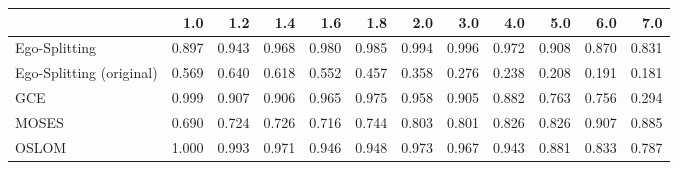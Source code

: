 \begin{tabular}{lrrrrrrrrrrr}
\toprule
{} &   1.0 &   1.2 &   1.4 &   1.6 &   1.8 &   2.0 &   3.0 &   4.0 &   5.0 &   6.0 &   7.0 \\
\midrule
Ego-Splitting            & 0.897 & 0.943 & 0.968 & 0.980 & 0.985 & 0.994 & 0.996 & 0.972 & 0.908 & 0.870 & 0.831 \\
Ego-Splitting (original) & 0.569 & 0.640 & 0.618 & 0.552 & 0.457 & 0.358 & 0.276 & 0.238 & 0.208 & 0.191 & 0.181 \\
GCE                      & 0.999 & 0.907 & 0.906 & 0.965 & 0.975 & 0.958 & 0.905 & 0.882 & 0.763 & 0.756 & 0.294 \\
MOSES                    & 0.690 & 0.724 & 0.726 & 0.716 & 0.744 & 0.803 & 0.801 & 0.826 & 0.826 & 0.907 & 0.885 \\
OSLOM                    & 1.000 & 0.993 & 0.971 & 0.946 & 0.948 & 0.973 & 0.967 & 0.943 & 0.881 & 0.833 & 0.787 \\
\bottomrule
\end{tabular}

